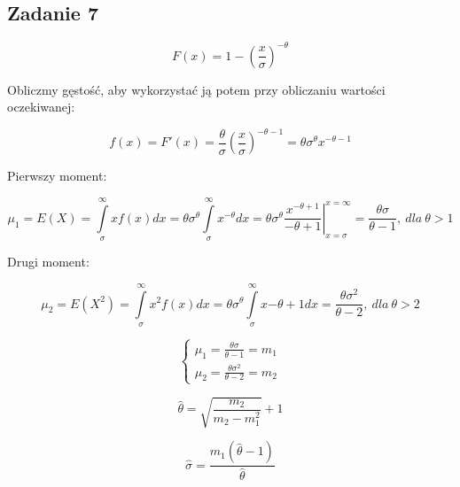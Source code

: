 \subsection{Zadanie 7}
$$
F(x) = 1 - (\frac{x}{\sigma})^{-\theta}
$$

Obliczmy gęstość, aby wykorzystać ją potem przy obliczaniu wartości oczekiwanej:

$$
f(x) = F'(x) = \frac{\theta}{\sigma}(\frac{x}{\sigma})^{-\theta-1} = \theta\sigma^{\theta}x^{-\theta-1}
$$

Pierwszy moment:

$$
\mu_1 = E(X) = \int\limits_{\sigma}^{\infty} xf(x)dx = \theta\sigma^{\theta} \int\limits_{\sigma}^{\infty}x^{-\theta}dx = \left. \theta\sigma^{\theta}\frac{x^{-\theta+1}}{-\theta+1} \right|^{x=\infty}_{x=\sigma} = \frac{\theta\sigma}{\theta-1},\  dla \  \theta > 1
$$

Drugi moment:

$$
\mu_2 = E(X^2) = \int\limits_{\sigma}^{\infty}x^2f(x)dx = \theta\sigma^{\theta}\int\limits_{\sigma}^{\infty}x{-\theta+1}dx = \frac{\theta\sigma^2}{\theta-2}, \ dla \ \theta>2
$$

$$
\begin{cases} \mu_1 = \frac{\theta\sigma}{\theta-1} = m_1 \\
\mu_2 = \frac{\theta\sigma^2}{\theta-2} = m_2\end{cases}
$$

$$
\hat{\theta} = \sqrt{\frac{m_2}{m_2-m_1^2}}+1
$$

$$
\hat{\sigma} = \frac{m_1(\hat{\theta}-1)}{\hat{\theta}}
$$
